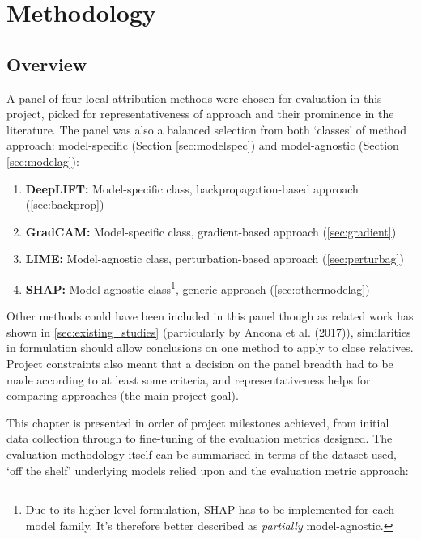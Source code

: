 \documentclass[main]{subfiles}
\begin{document}
\chapter{Methodology}

\section{Overview}

A panel of four local attribution methods were chosen for evaluation in this project, picked for representativeness of approach and their prominence in the literature. The panel was also a balanced selection from both `classes' of method approach: model-specific (Section \ref{sec:modelspec}) and model-agnostic (Section \ref{sec:modelag}):

\begin{enumerate}

\item \textbf{DeepLIFT:} Model-specific class, backpropagation-based approach (\ref{sec:backprop})
\item \textbf{GradCAM:} Model-specific class, gradient-based approach (\ref{sec:gradient})
\item \textbf{LIME:} Model-agnostic class, perturbation-based approach (\ref{sec:perturbag})
\item \textbf{SHAP:} Model-agnostic class\footnote{Due to its higher level formulation, SHAP has to be implemented for each model family. It's therefore better described as \textit{partially} model-agnostic.}, generic approach (\ref{sec:othermodelag})

\end{enumerate}

Other methods could have been included in this panel though as related work has shown in \ref{sec:existing_studies} (particularly by Ancona et al. (2017)), similarities in formulation should allow conclusions on one method to apply to close relatives. Project constraints also meant that a decision on the panel breadth had to be made according to at least some criteria, and representativeness helps for comparing approaches (the main project goal).

This chapter is presented in order of project milestones achieved, from initial data collection through to fine-tuning of the evaluation metrics designed. The evaluation methodology itself can be summarised in terms of the dataset used, `off the shelf' underlying models relied upon and the evaluation metric approach:
\newpage
\end{document}
